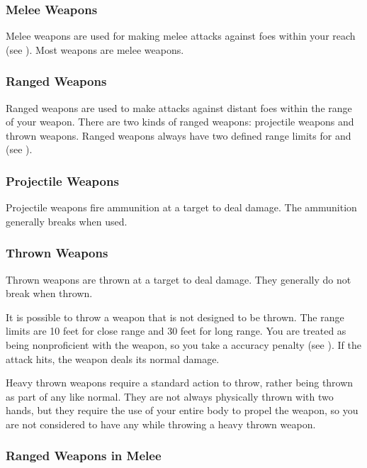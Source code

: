         \subsubsection{Melee Weapons}
            Melee weapons are used for making melee attacks against foes within your reach (see ). Most weapons are melee weapons.

        \subsubsection{Ranged Weapons}
            Ranged weapons are used to make attacks against distant foes within the range of your weapon. There are two kinds of ranged weapons: projectile weapons and thrown weapons.
            Ranged weapons always have two defined range limits for  and  (see ).

            \subsubsection{Projectile Weapons} Projectile weapons fire ammunition at a target to deal damage. The ammunition generally breaks when used.

            \subsubsection{Thrown Weapons}\label{Thrown Weapons} Thrown weapons are thrown at a target to deal damage. They generally do not break when thrown.

                 It is possible to throw a weapon that is not designed to be thrown.
                The range limits are 10 feet for close range and 30 feet for long range.
                You are treated as being nonproficient with the weapon, so you take a  accuracy penalty (see ).
                If the attack hits, the weapon deals its normal damage.

                 Heavy thrown weapons require a standard action to throw, rather being thrown as part of any  like normal.
                They are not always physically thrown with two hands, but they require the use of your entire body to propel the weapon, so you are not considered to have any  while throwing a heavy thrown weapon.

            \subsubsection{Ranged Weapons in Melee}

